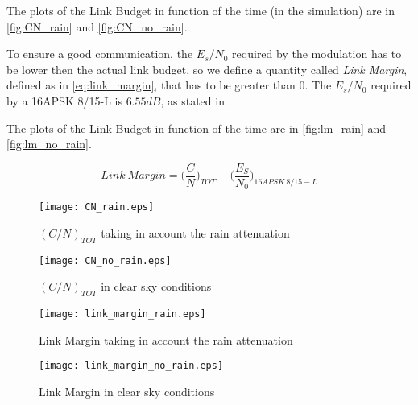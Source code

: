 The plots of the Link Budget in function of the time (in the simulation) are in	\autoref{fig:CN_rain} and \autoref{fig:CN_no_rain}.

To ensure a good communication, the $E_s/N_0$ required by the modulation has to be lower then the actual link budget, so we define a quantity called \textit{Link Margin}, defined as in \autoref{eq:link_margin}, that has to be greater than 0. The $E_s/N_0$ required by a 16APSK 8/15-L is $6.55dB$, as stated in \cite{dvbs2x}.

The plots of the Link Budget in function of the time are in	\autoref{fig:lm_rain} and \autoref{fig:lm_no_rain}.

\begin{equation}\label{eq:link_margin}
	Link ~Margin = \bigg(\frac{C}{N}\bigg)_{TOT} - \bigg(\frac{E_S}{N_0}\bigg)_{16APSK ~8/15-L}
\end{equation}

\begin{figure}[ht]
	\begin{minipage}{.5\textwidth}
		\centering
		\texttt{[image: CN\_rain.eps]}
		\caption{$(C/N)_{TOT}$ taking in account the rain attenuation}
		\label{fig:CN_rain}
	\end{minipage}\hspace{0.5cm}
	\begin{minipage}{.5\textwidth}
		\centering
		\texttt{[image: CN\_no\_rain.eps]}
		\caption{$(C/N)_{TOT}$ in clear sky conditions}
		\label{fig:CN_no_rain}
	\end{minipage}
\end{figure}

\begin{figure}[ht]
	\begin{minipage}{.5\textwidth}
		\centering
		\texttt{[image: link\_margin\_rain.eps]}
		\caption{Link Margin taking in account the rain attenuation}
		\label{fig:lm_rain}
	\end{minipage}\hspace{0.5cm}
	\begin{minipage}{.5\textwidth}
		\centering
		\texttt{[image: link\_margin\_no\_rain.eps]}
		\caption{Link Margin in clear sky conditions}
		\label{fig:lm_no_rain}
	\end{minipage}
\end{figure}

